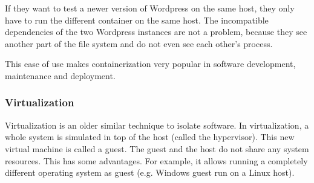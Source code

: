 If they want to test a newer version of Wordpress on the same host, they only have to run the different container on the same host. The incompatible dependencies of the two Wordpress instances are not a problem, because they see another part of the file system and do not even see each other's process.

\hfill

This ease of use makes containerization very popular in software development, maintenance and deployment.

\pagebreak

\subsubsection{Virtualization}
Virtualization is an older similar technique to isolate software. In virtualization, a whole system is simulated in top of the host (called the hypervisor). This new virtual machine is called a guest. The guest and the host do not share any system resources. This has some advantages. For example, it allows running a completely different operating system as guest (e.g. Windows guest run on a Linux host).

